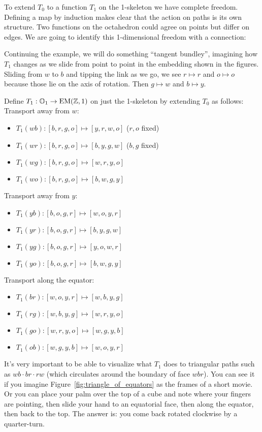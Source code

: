 To extend \( T_0 \) to a function \( T_1 \) on the 1-skeleton we have complete freedom. Defining a map by induction makes clear that the action on paths is its own structure. Two functions on the octahedron could agree on points but differ on edges. We are going to identify this 1-dimensional freedom with a connection:

Continuing the example, we will do something ``tangent bundley'', imagining how \( T_1 \) changes as we slide from point to point in the embedding shown in the figures. Sliding from \( w \) to \( b \) and tipping the link as we go, we see \( r\mapsto r \) and \( o\mapsto o \) because those lie on the axis of rotation. Then \( g\mapsto w \) and \( b\mapsto y \). 

\begin{mydef}
Define \( T_1:\mathbb{O}_1\to\mathrm{EM}(\mathbb{Z},1) \) on just the 1-skeleton by extending \( T_0 \) as follows:
Transport away from \( w \):
\begin{itemize}
\item \( T_1(wb):[b, r, g, o]\mapsto [y, r, w, o] \) (\( r, o \) fixed)
\item \( T_1(wr):[b, r, g, o]\mapsto [b, y, g, w] \) (\( b, g \) fixed)
\item \( T_1(wg):[b, r, g, o]\mapsto [w, r, y, o] \)
\item \( T_1(wo):[b, r, g, o]\mapsto [b, w, g, y] \)
\end{itemize}
Transport away from \( y \):
\begin{itemize}
\item \( T_1(yb):[b, o, g, r]\mapsto [w, o, y, r] \)
\item \( T_1(yr):[b, o, g, r]\mapsto [b, y, g, w] \)
\item \( T_1(yg):[b, o, g, r]\mapsto [y, o, w, r] \)
\item \( T_1(yo):[b, o, g, r]\mapsto [b, w, g, y] \)
\end{itemize}
Transport along the equator:
\begin{itemize}
\item \( T_1(br):[w, o, y, r]\mapsto [w, b, y, g] \) 
\item \( T_1(rg):[w, b, y, g]\mapsto [w, r, y, o] \)
\item \( T_1(go):[w, r, y, o]\mapsto [w, g, y, b] \)
\item \( T_1(ob):[w, g, y, b]\mapsto [w, o, y, r] \)
\end{itemize}
\end{mydef}

It's very important to be able to visualize what \( T_1 \) does to triangular paths such as \( wb\cdot br\cdot rw \) (which circulates around the boundary of face \( wbr \)). You can see it if you imagine Figure~\ref{fig:triangle_of_equators} as the frames of a short movie. Or you can place your palm over the top of a cube and note where your fingers are pointing, then slide your hand to an equatorial face, then along the equator, then back to the top. The answer is: you come back rotated clockwise by a quarter-turn. 

